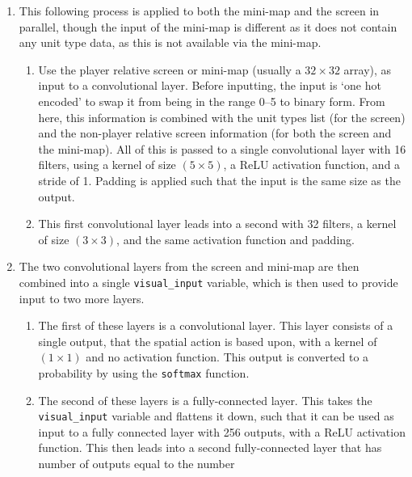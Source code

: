 \begin{enumerate}
    \item This following process is applied to both the mini-map and the screen
        in parallel, though the input of the mini-map is different as it does
        not contain any unit type data, as this is not available via the
        mini-map.
        \begin{enumerate}
            \item Use the player relative screen or mini-map (usually a $32
                \times 32$ array), as input to a convolutional layer. Before
                inputting, the input is `one hot encoded' to swap it from being
                in the range 0--5 to binary form. From here, this information
                is combined with the unit types list (for the screen) and the
                non-player relative screen information (for both the screen and
                the mini-map). All of this is passed to a single convolutional
                layer with 16 filters, using a kernel of size $(5 \times 5)$, a
                ReLU activation function, and a stride of 1. Padding is applied
                such that the input is the same size as the output.
            \item This first convolutional layer leads into a second with 32 filters, a
                kernel of size $(3 \times 3)$, and the same activation function and
                padding.
    \end{enumerate}
    \item The two convolutional layers from the screen and mini-map are then
        combined into a single \texttt{visual\_input} variable, which is then
        used to provide input to two more layers.
    \begin{enumerate}
        \item The first of these layers is a convolutional layer. This layer
            consists of a single output, that the spatial action is based upon,
            with a kernel of $(1 \times 1)$ and no activation function. This
            output is converted to a probability by using the \texttt{softmax}
            function.
        \item The second of these layers is a fully-connected layer. This takes
            the \texttt{visual\_input} variable and flattens it down, such that
            it can be used as input to a fully connected layer with 256 outputs,
            with a ReLU activation function. This then leads into a second
            fully-connected layer that has number of outputs equal to the number

\end{enumerate}
\end{enumerate}
